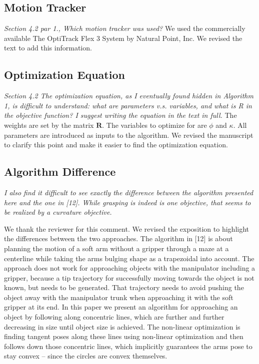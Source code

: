 \documentclass[letterpaper, 10 pt, twocolumn, conference]{article}
\begin{document}
\subsection{Motion Tracker}
\textit{Section 4.2 par 1., Which motion tracker was used?}
We used the commercially available The OptiTrack Flex 3 System by Natural Point, Inc. We revised the text to add this information.
%
\subsection{Optimization Equation}
\textit{Section 4.2 The optimization equation, as I eventually found hidden in Algorithm 1, is difficult to understand: what are parameters v.s. variables, and what is R in the objective function? I suggest writing the equation in the text in full.}
%
The weights are set by the matrix $\mathbf{R}$. The variables to optimize for are $\phi$ and $\kappa$. All parameters are introduced as inputs to the algorithm. We revised the manuscript to clarify this point and make it easier to find the optimization equation. 
%
\subsection{Algorithm Difference}
\textit{I also find it difficult to see exactly the difference between the algorithm presented here and the one in [12]. While grasping is indeed is one objective, that seems to be realized by a curvature objective.} 

We thank the reviewer for this comment. We revised the exposition to highlight the differences between the two approaches. The algorithm in [12] is about planning the motion of a soft arm without a gripper through a maze at a centerline while taking the arms bulging shape as a trapezoidal into account. The approach does not work for approaching objects with the manipulator including a gripper, because a tip trajectory for successfully moving towards the object is not known, but needs to be generated. That trajectory needs to avoid pushing the object away with the manipulator trunk when approaching it with the soft gripper at its end. In this paper we present an algorithm for approaching an object by following along concentric lines, which are further and further decreasing in size until object size is achieved. The non-linear optimization is finding tangent poses along these lines using non-linear optimization and then follows down those concentric lines, which implicitly guarantees the arms pose to stay convex – since the circles are convex themselves.
\end{document}
